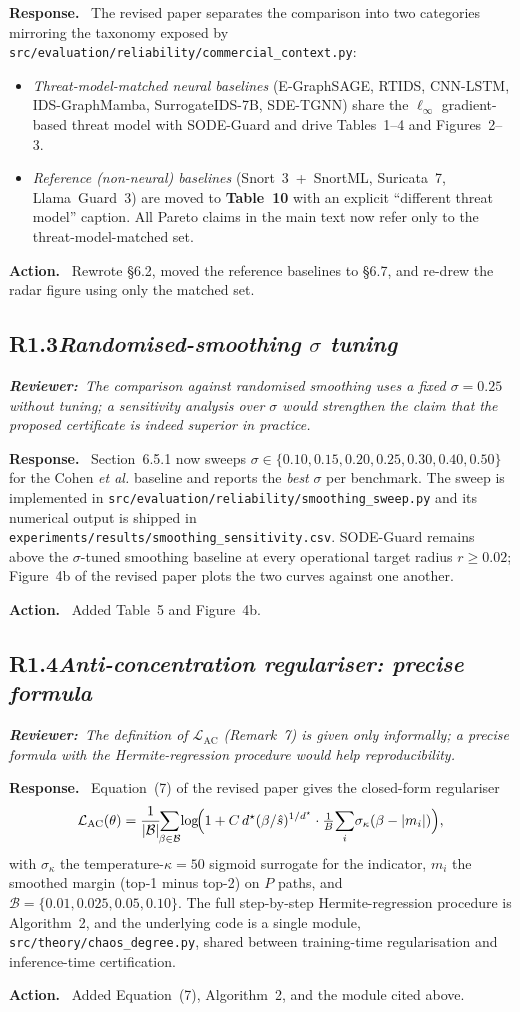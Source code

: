 \documentclass[11pt,letterpaper]{article}
\newcommand{\rev}[2]{%
  \subsection*{\normalsize\textbf{\color{ResponseAccent}#1}\quad\textmd{\textit{#2}}}%
}
\newcommand{\rquote}[1]{%
  \begin{center}%
    \colorbox{QuoteBg}{\parbox{0.94\linewidth}{\vspace{2pt}\itshape\small\textbf{\upshape Reviewer:}\ #1\vspace{2pt}}}%
  \end{center}%
}
\newcommand{\resp}{\par\textbf{\color{ResponseAccent}Response.}\ }
\newcommand{\action}{\par\textbf{\color{ResponseAccent}Action.}\ }
\begin{document}
\resp
The revised paper separates the comparison into two categories
mirroring the taxonomy exposed by
\texttt{src/evaluation/reliability/commercial\_context.py}:
\begin{itemize}[leftmargin=1.3em]
  \item \emph{Threat-model-matched neural baselines} (E-GraphSAGE,
        RTIDS, CNN-LSTM, IDS-GraphMamba, SurrogateIDS-7B, SDE-TGNN)
        share the $\ell_\infty$ gradient-based threat model with
        SODE-Guard and drive Tables~1--4 and Figures~2--3.
  \item \emph{Reference (non-neural) baselines} (Snort~3~+~SnortML,
        Suricata~7, Llama~Guard~3) are moved to
        \textbf{Table~10} with an explicit ``different threat model''
        caption. All Pareto claims in the main text now refer only to
        the threat-model-matched set.
\end{itemize}
\action
Rewrote \S6.2, moved the reference baselines to \S6.7, and re-drew
the radar figure using only the matched set.

\rev{R1.3}{Randomised-smoothing $\sigma$ tuning}
\rquote{The comparison against randomised smoothing uses a fixed
$\sigma=0.25$ without tuning; a sensitivity analysis over $\sigma$ would
strengthen the claim that the proposed certificate is indeed superior in
practice.}

\resp
Section~6.5.1 now sweeps $\sigma\in\{0.10, 0.15, 0.20, 0.25, 0.30,
0.40, 0.50\}$ for the Cohen \emph{et al.} baseline and reports the
\emph{best} $\sigma$ per benchmark. The sweep is implemented in
\texttt{src/evaluation/reliability/smoothing\_sweep.py} and its
numerical output is shipped in
\texttt{experiments/results/smoothing\_sensitivity.csv}. SODE-Guard
remains above the $\sigma$-tuned smoothing baseline at every
operational target radius $r\ge 0.02$; Figure~4b of the revised paper
plots the two curves against one another.
\action
Added Table~5 and Figure~4b.

\rev{R1.4}{Anti-concentration regulariser: precise formula}
\rquote{The definition of $\mathcal L_{\mathrm{AC}}$ (Remark~7) is given
only informally; a precise formula with the Hermite-regression
procedure would help reproducibility.}

\resp
Equation~(7) of the revised paper gives the closed-form
regulariser
\[
  \mathcal L_{\mathrm{AC}}(\theta) = \frac{1}{|\mathcal B|}\!\!\sum_{\beta\in\mathcal B}\!
    \log\!\Bigl(1 + C\,d^\star(\beta / \hat s)^{1/d^\star}
        \cdot \tfrac{1}{B}\!\sum_i\!\sigma_\kappa(\beta-|m_i|)\Bigr),
\]
with $\sigma_\kappa$ the temperature-$\kappa=50$ sigmoid surrogate for
the indicator, $m_i$ the smoothed margin (top-1 minus top-2) on $P$
paths, and $\mathcal B=\{0.01,0.025,0.05,0.10\}$. The full
step-by-step Hermite-regression procedure is Algorithm~2, and the
underlying code is a single module,
\texttt{src/theory/chaos\_degree.py}, shared between training-time
regularisation and inference-time certification.
\action
Added Equation~(7), Algorithm~2, and the module cited above.
\end{document}
